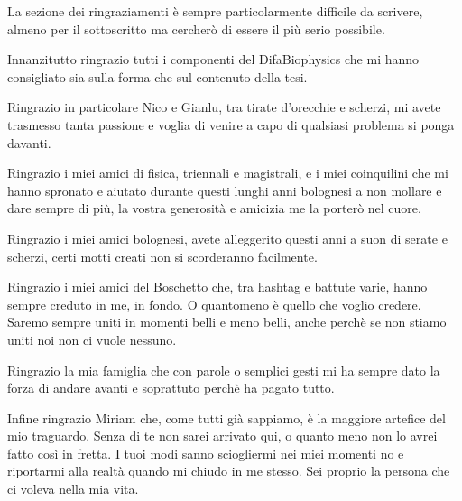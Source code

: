 La sezione dei ringraziamenti è sempre particolarmente difficile da scrivere, almeno per il sottoscritto ma cercherò di essere il più serio possibile.

Innanzitutto ringrazio tutti i componenti del DifaBiophysics che mi hanno consigliato sia sulla forma che sul contenuto della tesi. 

Ringrazio in particolare Nico e Gianlu, tra tirate d'orecchie e scherzi, mi avete trasmesso tanta passione e voglia di venire a capo di qualsiasi problema si ponga davanti.

Ringrazio i miei amici di fisica, triennali e magistrali, e i miei coinquilini che mi hanno spronato e aiutato durante questi lunghi anni bolognesi a non mollare e dare sempre di più, la vostra generosità e amicizia me la porterò nel cuore.

Ringrazio i miei amici bolognesi, avete alleggerito questi anni a suon di serate e scherzi, certi motti creati non si scorderanno facilmente.

Ringrazio i miei amici del Boschetto che, tra hashtag e battute varie, hanno sempre creduto in me, in fondo. 
O quantomeno è quello che voglio credere.
Saremo sempre uniti in momenti belli e meno belli, anche perchè se non stiamo uniti noi non ci vuole nessuno.

Ringrazio la mia famiglia che con parole o semplici gesti mi ha sempre dato la forza di andare avanti e soprattuto perchè ha pagato tutto.

Infine ringrazio Miriam che, come tutti già sappiamo, è la maggiore artefice del mio traguardo.
Senza di te non sarei arrivato qui, o quanto meno non lo avrei fatto così in fretta.
I tuoi modi sanno sciogliermi nei miei momenti no e riportarmi alla realtà quando mi chiudo in me stesso.
Sei proprio la persona che ci voleva nella mia vita.

